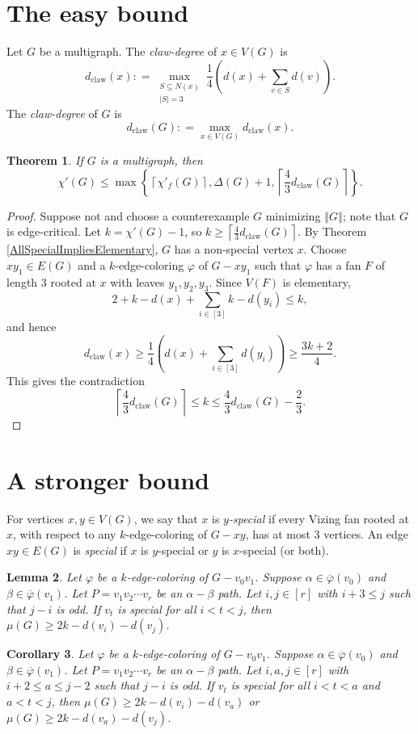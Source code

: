 \documentclass[12pt]{amsart}
\theoremstyle{plain}
\newtheorem{thm}{Theorem}
\newtheorem{lem}[thm]{Lemma}
\newtheorem{cor}[thm]{Corollary}
\theoremstyle{definition}
\theoremstyle{remark}
\newcommand{\set}[1]{\left\{ #1 \right\}}
\newcommand{\card}[1]{\left|#1\right|}
\newcommand{\size}[1]{\left\Vert#1\right\Vert}
\newcommand{\ceil}[1]{\left\lceil#1\right\rceil}
\newcommand{\irange}[1]{\left[#1\right]}
\newcommand{\parens}[1]{\left( #1 \right)}
\newcommand{\DefinedAs}{\mathrel{\mathop:}=}
\newcommand{\dclaw}[1]{d_{\text{claw}}\left( #1 \right)}
\newcommand{\vph}{\varphi}
\newcommand{\vphn}{\overline{\varphi}}
\begin{document}
\section{The easy bound}
Let $G$ be a multigraph.  The \emph{claw-degree} of $x \in V(G)$ is 
\[\dclaw{x} \DefinedAs \max_{\substack{S \subseteq N(x) \\ \card{S} = 3}}\frac14 \parens{d(x) + \sum_{v \in S} d(v)}.\]
The \emph{claw-degree} of $G$ is 
\[\dclaw{G} \DefinedAs \max_{x \in V(G)} \dclaw{x}.\]
\begin{thm}\label{EasyBound}
If $G$ is a multigraph, then
\[\chi'(G) \le \max\set{\ceil{\chi'_f(G)}, \Delta(G) + 1, \ceil{\frac43\dclaw{G}}}.\]
\end{thm}
\begin{proof}
Suppose not and choose a counterexample $G$ minimizing $\size{G}$; note that $G$ is
edge-critical. Let $k=\chi'(G)-1$, so $k \ge \ceil{\frac43\dclaw{G}}$. 
By Theorem \ref{AllSpecialImpliesElementary}, $G$ has a non-special vertex $x$.
Choose $xy_1 \in E(G)$ and a $k$-edge-coloring $\vph$ of $G - xy_1$ such that
$\vph$ has a fan $F$ of length $3$ rooted at $x$ with leaves $y_1, y_2, y_3$.  
Since $V(F)$ is elementary, 
\[2 + k - d(x) + \sum_{i \in \irange{3}} k-d(y_i) \le k,\]
and hence
\[\dclaw{x} \ge \frac14\parens{d(x) + \sum_{i \in \irange{3}} d(y_i)} \ge \frac{3k+2}{4}.\]
This gives the contradiction
\[\ceil{\frac43\dclaw{G}} \le k \le \frac43\dclaw{G} - \frac23.\]
\end{proof}

\section{A stronger bound}
For vertices $x,y \in V(G)$, we say that $x$ is \emph{$y$-special} if every Vizing fan rooted at $x$, with respect to any $k$-edge-coloring of $G-xy$, has at most 3 vertices.
An edge $xy \in E(G)$ is \emph{special} if $x$ is $y$-special or $y$ is $x$-special (or both).

\begin{lem}\label{HelperOne}
Let $\vph$ be a $k$-edge-coloring of $G-v_0v_1$.  Suppose $\alpha \in \vphn(v_0)$ and $\beta \in \vphn(v_1)$.  
Let $P = v_1v_2\cdots v_r$ be an $\alpha-\beta$ path.  Let $i,j \in \irange{r}$ with $i + 3 \le j$ such that $j-i$ is odd.  If $v_t$ is special for all $i < t < j$, then
$\mu(G) \ge 2k - d(v_i) - d(v_j)$.
\end{lem}

\begin{cor}\label{HelperTwo}
Let $\vph$ be a $k$-edge-coloring of $G-v_0v_1$.  Suppose $\alpha \in \vphn(v_0)$ and $\beta \in \vphn(v_1)$.  
Let $P = v_1v_2\cdots v_r$ be an $\alpha-\beta$ path.  Let $i,a,j \in \irange{r}$ with $i + 2 \le a \le j - 2$ such that $j-i$ is odd.  If $v_t$ is special for all $i < t < a$ and $a < t < j$, then
$\mu(G) \ge 2k - d(v_i) - d(v_a)$ or $\mu(G) \ge 2k - d(v_a) - d(v_j)$.
\end{cor}
\end{document}
